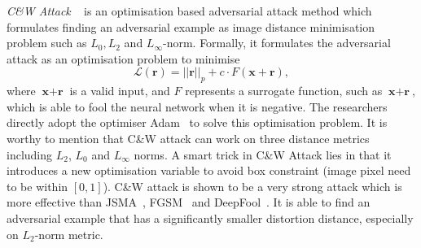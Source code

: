 {\em  C\&W Attack} ~\cite{CW2016} is an optimisation based adversarial attack method which formulates finding an adversarial example as image distance minimisation problem such as $L_0, L_2$ and $L_\infty$-norm. Formally, it formulates the adversarial attack as an optimisation problem to minimise
\begin{equation}
{\mathcal{L}}(\textbf{r}) = ||\textbf{r}||_p + c \cdot F(\textbf{x} + \textbf{r}),
\end{equation} 
where $\textbf{x}+\textbf{r}$ is a valid input, and $F$ represents a surrogate function, such as $\textbf{x}+\textbf{r}$, which is able to fool the neural network when it is negative. The researchers directly adopt the optimiser Adam~\cite{kingma2014adam} to solve this optimisation problem. 
It is worthy to mention that C\&W attack can work on three distance metrics including $L_2$, $L_0$ and $L_{\infty}$ norms. 
%
A smart trick in C\&W Attack lies in that it introduces a new optimisation variable to avoid box constraint (image pixel need to be within $[0,1]$).  C\&W attack is shown to be a very strong attack which is more effective than JSMA~\cite{JSMA}, FGSM~\cite{DBLP:journals/corr/GoodfellowSS14} and DeepFool~\cite{moosavi2016deepfool}. It is able to find an adversarial example that has a significantly smaller distortion distance, especially on $L_2$-norm metric. 

	


